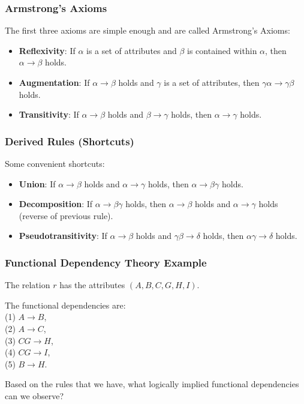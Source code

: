 \begin{frame}
\frametitle{Armstrong's Axioms}
The first three axioms are simple enough and are called \alert{Armstrong's Axioms}:

\begin{itemize}
	\item \textbf{Reflexivity}: If $\alpha$ is a set of attributes and $\beta$ is contained within $\alpha$, then $\alpha \rightarrow \beta$ holds.
	\item \textbf{Augmentation}: If $\alpha \rightarrow \beta$ holds and $\gamma$ is a set of attributes, then $\gamma\alpha \rightarrow \gamma\beta$ holds.
	\item \textbf{Transitivity}: If $\alpha \rightarrow \beta$ holds and $\beta \rightarrow \gamma$ holds, then $\alpha \rightarrow \gamma$ holds.
\end{itemize}

\end{frame}



\begin{frame}
\frametitle{Derived Rules (Shortcuts)}

Some convenient shortcuts:

\begin{itemize}
	\item \textbf{Union}: If $\alpha \rightarrow \beta$ holds and $\alpha \rightarrow \gamma$ holds, then $\alpha \rightarrow \beta\gamma$ holds.
	\item \textbf{Decomposition}: If $\alpha \rightarrow \beta\gamma$ holds, then  $\alpha \rightarrow \beta$ holds and $\alpha \rightarrow \gamma$ holds (reverse of previous rule).
	\item \textbf{Pseudotransitivity}: If $\alpha \rightarrow \beta$ holds and $\gamma\beta \rightarrow \delta$ holds, then $\alpha\gamma \rightarrow \delta$ holds.
\end{itemize}

\end{frame}


\begin{frame}
\frametitle{Functional Dependency Theory Example}

The relation $r$ has the attributes $(A, B, C, G, H, I)$.

The functional dependencies are: \\
\quad (1) $A \rightarrow B$, \\ 
\quad (2) $A \rightarrow C$, \\ 
\quad (3) $CG \rightarrow H$, \\ 
\quad (4) $CG \rightarrow I$, \\ 
\quad (5) $B \rightarrow H$.

Based on the rules that we have, what logically implied functional dependencies can we observe?

\end{frame}



